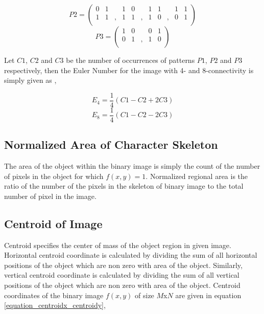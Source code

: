 $$ P2=
\left(
\begin{array}{ccccccccccc}
    0 & 1 &  & 1 & 0 &  & 1 & 1 &  & 1 & 1 \\
    1 & 1 &, & 1 & 1 &, & 1 & 0 &, & 0 & 1 \\
\end{array}
\right)
$$
$$ P3=
\left(
\begin{array}{ccccc}
1&0& &0&1 \\
0&1&,&1&0 \\
\end{array}
\right)
$$

Let $C1$, $C2$ and $C3$ be the number of occurrences of patterns $P1$, $P2$ and $P3$ respectively, then the Euler Number for the image with 4- and 8-connectivity is simply given as \cite{Pratt1991},

\begin{equation}
E_4=\frac{1}{4}(C1-C2+2C3)
\end{equation}
\begin{equation}
E_8=\frac{1}{4}(C1-C2-2C3)
\end{equation}

\subsection{Normalized Area of Character Skeleton}
\label{section_area}
The area of the object within the binary image is simply the count of the number of pixels in the object for which $ f(x,y)=1 $. Normalized regional area is the ratio of the number of the pixels in the skeleton of binary image to the total number of pixel in the image.

\subsection{Centroid of Image}
\label{section_centroid}

Centroid specifies the center of mass of the object region in given image. Horizontal centroid coordinate is calculated by dividing the sum of all horizontal positions of the object which are non zero with area of the object. Similarly, vertical centroid coordinate is calculated by dividing the sum of all vertical positions of the object which are non zero with area of the object. Centroid coordinates of the binary image $f(x,y)$ of size $M$x$N$ are given in equation \ref{equation_centroidx_centroidy},

